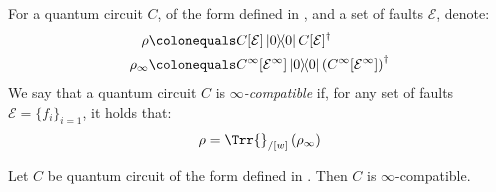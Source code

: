\begin{definition}
  For a quantum circuit $C$, of the form defined in , and a set of faults $\mathcal{E}$, denote:
  \begin{equation*}
    \begin{split}
      \rho & \colonequals C[\mathcal{E}] \ketbra{0}{0} C[\mathcal{E}]^{\dagger} \\
      \rho_{\infty} & \colonequals C^{\infty}[\mathcal{E}^{\infty}]\ketbra{0}{0}\left(C^{\infty}[\mathcal{E}^{\infty}]\right)^{\dagger}
    \end{split}
  \end{equation*}
  We say that a quantum circuit $C$ is \textit{$\infty$-compatible} if, for any set of faults $\mathcal{E} = \{ f_{i} \}_{i=1}$, it holds that:
  \begin{equation*}
    \begin{split}
      \rho =  \Trr{}_{/[w]}\left( \rho_{\infty} \right) 
    \end{split}
  \end{equation*}
\end{definition}
\begin{claim}
  Let $C$ be quantum circuit of the form defined in . Then $C$ is $\infty$-compatible.
\end{claim}
